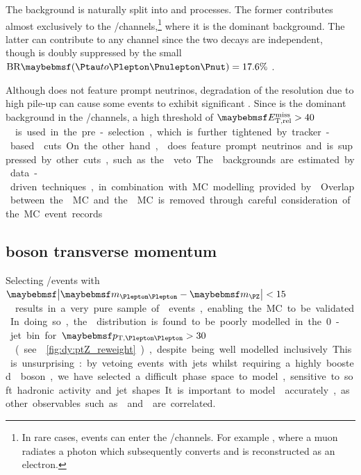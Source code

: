 
The \DY background is naturally split into \DYll and \DYtt processes. The former 
contributes almost exclusively to the \eech/\mmch channels,\footnote{
	In rare cases, \DYll events can enter the \emch/\mech channels. For example 
	\HepProcess{\DY \HepTo \Pmu\Pmu\Pphoton}, where a muon radiates a photon which 
	subsequently converts and is reconstructed as an electron.
}
where it is the dominant background. The latter can contribute to any channel since the 
two \HepProcess{\Ptau \HepTo \Plepton\Pnulepton\Pnut} decays are independent, though is 
doubly suppressed by the small $\text{BR}\parenths{\HepProcess{\Ptau \HepTo 
\Plepton\Pnulepton\Pnut}} = 17.6\%$ \cite{PDG:2012}.

Although \DYll does not feature prompt neutrinos, degradation of the \met resolution due 
to high pile-up can cause some \DYll events to exhibit significant \met. Since \DYll is the 
dominant background in the \eech/\mmch channels, a high threshold of 
\unit{$\calometrel > 40$}{\GeV} is used in the pre-selection, which is further tightened by 
tracker-based \trackmetrel cuts. On the other hand, \DYtt does feature prompt neutrinos and 
is suppressed by other cuts, such as the \mtautau veto.

The \DY backgrounds are estimated by data-driven techniques, in combination with MC 
modelling provided by \meps{\alpgen}{\fherwig}. Overlap between the \DY MC and the 
\Zgamma MC is removed through careful consideration of the MC event records.



\newpage
\subsection{\DY boson transverse momentum}
\label{sec:dy:pt}

Selecting \eech/\mmch events with \unit{$\mods{\mll - \mZ} < 15$}{\GeV} results in a very 
pure sample of \DYll events, enabling the MC to be validated. In doing so, the \ptll 
distribution is found to be poorly modelled in the 0-jet bin for \unit{$\ptll > 30$}{\GeV} 
(see \Figure~\ref{fig:dy:ptZ_reweight}), despite being well modelled inclusively. 
This is unsurprising: by vetoing events with jets whilst requiring a highly boosted \DY 
boson, we have selected a difficult phase space to model, sensitive to soft hadronic 
activity and jet shapes. It is important to model \ptll accurately, as other observables 
such as \dphill and \ptleadlep are correlated.

